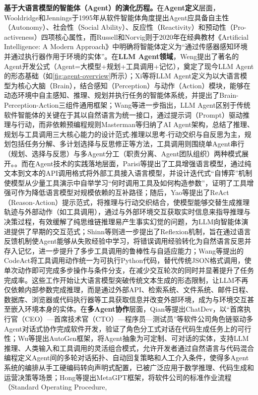 \textbf{基于大语言模型的智能体（Agent）的演化历程。}在\textbf{Agent定义}层面，Wooldridge和Jennings\cite{wooldridge1995intelligent}于1995年从软件智能体角度提出Agent应具备自主性（Autonomy）、社会性（Social Ability）、反应性（Reactivity）和预动性（Pro-activeness）四项核心属性，而Russell和Norvig\cite{russell2020artificial}则于2020年在经典教材《Artificial Intelligence: A Modern Approach》中明确将智能体定义为“通过传感器感知环境并通过执行器作用于环境的实体”。在\textbf{LLM Agent领域}，Weng\cite{weng2023agent}提出了著名的Agent开发公式（Agent=大模型+规划+工具调用+记忆），奠定了现今LLM Agent的形态基础（如\autoref{fig:agent-overview}所示）；Xi等\cite{xi2025rise}将LLM Agent定义为以大语言模型为核心大脑（Brain），结合感知（Perception）与动作（Action）模块，能够在动态环境中自主感知、推理、规划并执行任务的智能体系统，并提出了Brain-Perception-Action三组件通用框架；Wang等\cite{wang2024survey}进一步指出，LLM Agent区别于传统软件智能体的关键在于其以自然语言为统一接口，通过提示词（Prompt）驱动推理与行动，而非依赖预编程规则Masterman等\cite{masterman2024landscape}归纳了AI Agent架构，总结了推理、规划与工具调用三大核心能力的设计范式:推理以思考-行动交织与自反思为主，规划包括任务分解、多计划选择与反思修正等方法，工具调用则围绕单Agent串行（规划、选择与反思）与多Agent分工（职责分离、Agent团队组织）两种模式展开。。而在Agent技术的实践落地层面，Parisi等\cite{parisi2022talm}提出了工具增强语言模型，通过纯文本到文本的API调用格式将外部工具接入语言模型，并设计迭代式“自博弈”机制使模型从少量工具演示中自举学习“何时调用工具及如何构造参数”，证明了工具增强可作为降低语言模型对规模依赖的互补路径；随后，Yao等\cite{yao2023react}提出了ReAct（Reason-Action）提示范式，将推理与行动交织结合，使模型能够交替生成推理轨迹与外部动作（如工具调用），通过与外部环境交互获取实时信息来指导推理与决策过程，有效缓解了纯思维链推理易产生事实幻觉的问题，为LLM向智能体演进提供了早期的交互范式；Shinn等\cite{shinn2023reflexion}则进一步提出了Reflexion机制，旨在通过语言反馈机制使Agent能够从失败经验中学习，将错误调用经验转化为自然语言反思并存入记忆，进一步提升了多步工具调用的鲁棒性与自适应能力；Wang等提出的\cite{wang2024codeact}CodeAct将工具调用动作统一为可执行Python代码，替代传统JSON格式调用，使单次动作即可完成多步操作与条件分支，在减少交互轮次的同时并显著提升了任务完成率。这些工作开始让大语言模型突破传统文本生成的形态限制，让LLM不再仅依赖内部参数完成推理，而是通过外部API、检索系统、文件系统、邮件日程、数据库、浏览器或代码执行器等工具获取信息并改变外部环境，成为与环境交互甚至嵌入环境本身的实体。在\textbf{多Agent协作}层面，Qian等\cite{qian2024chatdev}提出ChatDev，以“首席执行官（CEO）—首席技术官（CTO）—程序员—测试员”等软件公司角色链驱动多Agent对话式协作完成软件开发，验证了角色分工式对话在代码生成任务上的可行性；Wu等\cite{wu2024autogen}提出AutoGen框架，将Agent抽象为可定制、可对话的实体，支持LLM推理、人类输入和工具调用的灵活组合模式，允许开发者通过自然语言与代码混合编程定义Agent间的多轮对话拓扑、自动回复策略和人工介入条件，使得多Agent系统的编排从手工硬编码转向声明式配置，已被广泛应用于数学推理、代码生成和运营决策等场景；Hong等\cite{hong2024metagpt}提出MetaGPT框架，将软件公司的标准作业流程（Standard Operating Procedure, 